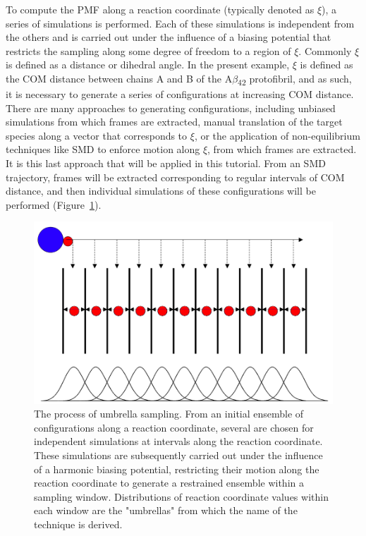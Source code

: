 \documentclass[9pt,tutorial,pubversion]{livecoms}
\begin{document}
To compute the PMF along a reaction coordinate (typically denoted as $\xi$), a series of simulations is performed. Each of these simulations is independent from the others and is carried out under the influence of a biasing potential that restricts the sampling along some degree of freedom to a region of $\xi$. Commonly $\xi$ is defined as a distance or dihedral angle. In the present example, $\xi$ is defined as the COM distance between chains A and B of the A$\beta$\textsubscript{42} protofibril, and as such, it is necessary to generate a series of configurations at increasing COM distance. There are many approaches to generating configurations, including unbiased simulations from which frames are extracted, manual translation of the target species along a vector that corresponds to $\xi$, or the application of non-equilibrium techniques like SMD to enforce motion along $\xi$, from which frames are extracted. It is this last approach that will be applied in this tutorial. From an SMD trajectory, frames will be extracted corresponding to regular intervals of COM distance, and then individual simulations of these configurations will be performed (Figure~\ref{umbrella_schematic_fig}).

\begin{figure}[ht!]
\centering
\includegraphics{umbrella_schematic2}
\caption{The process of umbrella sampling. From an initial ensemble of configurations along a reaction coordinate, several are chosen for independent simulations at intervals along the reaction coordinate. These simulations are subsequently carried out under the influence of a harmonic biasing potential, restricting their motion along the reaction coordinate to generate a restrained ensemble within a sampling window. Distributions of reaction coordinate values within each window are the "umbrellas" from which the name of the technique is derived.}
\label{umbrella_schematic_fig}
\end{figure}
\end{document}
